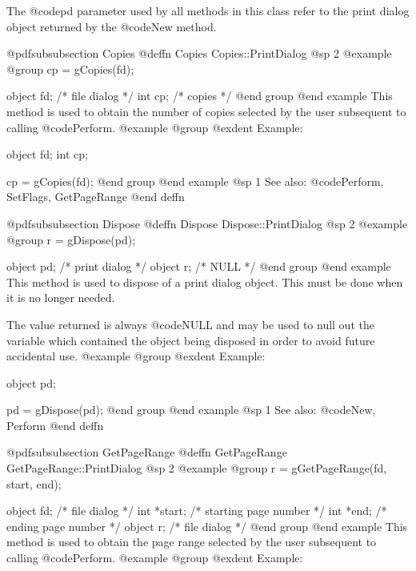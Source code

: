 The @code{pd} parameter used by all methods in this class refer to
the print dialog object returned by the @code{New} method.














@pdfsubsubsection {Copies}
@deffn {Copies} Copies::PrintDialog
@sp 2
@example
@group
cp = gCopies(fd);

object  fd;     /*  file dialog  */
int     cp;     /*  copies       */
@end group
@end example
This method is used to obtain the number of copies selected by the user
subsequent to calling @code{Perform}.
@example
@group
@exdent Example:

object  fd;
int     cp;

cp = gCopies(fd);
@end group
@end example
@sp 1
See also:  @code{Perform, SetFlags, GetPageRange}
@end deffn









@pdfsubsubsection {Dispose}
@deffn {Dispose} Dispose::PrintDialog
@sp 2
@example
@group
r = gDispose(pd);

object  pd;     /*  print dialog   */
object  r;      /*  NULL           */
@end group
@end example
This method is used to dispose of a print dialog object.  This must
be done when it is no longer needed.

The value returned is always @code{NULL} and may be used to null out
the variable which contained the object being disposed in order to
avoid future accidental use.
@example
@group
@exdent Example:

object  pd;

pd = gDispose(pd);
@end group
@end example
@sp 1
See also:  @code{New, Perform}
@end deffn











@pdfsubsubsection {GetPageRange}
@deffn {GetPageRange} GetPageRange::PrintDialog
@sp 2
@example
@group
r = gGetPageRange(fd, start, end);

object  fd;     /*  file dialog           */
int     *start; /*  starting page number  */
int     *end;   /*  ending page number    */
object  r;      /*  file dialog           */
@end group
@end example
This method is used to obtain the page range selected by the user
subsequent to calling @code{Perform}.
@example
@group
@exdent Example:

